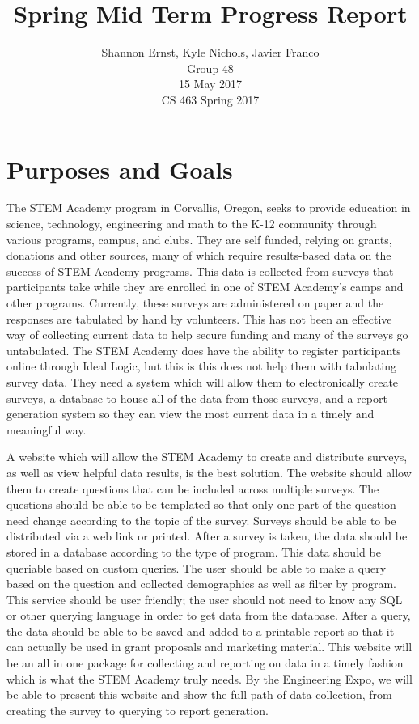 \documentclass[letterpaper,10pt,serif,draftclsnofoot,onecolumn,compsoc,titlepage]{IEEEtran}
\title{Spring Mid Term Progress Report}
\author{Shannon Ernst, Kyle Nichols, Javier Franco\\ Group 48 \\ 15 May 2017 \\ CS 463 Spring 2017}
\begin{document}
\maketitle
\begin{abstract}

\end{abstract}
\newpage
\tableofcontents
\newpage
\section{Purposes and Goals}
The STEM Academy program in Corvallis, Oregon, seeks to provide education in science, technology, engineering and math to the K-12 community through various programs, campus, and clubs.
They are self funded, relying on grants, donations and other sources, many of which require results-based data on the success of STEM Academy programs.
This data is collected from surveys that participants take while they are enrolled in one of STEM Academy's camps and other programs.
Currently, these surveys are administered on paper and the responses are tabulated by hand by volunteers.
This has not been an effective way of collecting current data to help secure funding and many of the surveys go untabulated.
The STEM Academy does have the ability to register participants online through Ideal Logic, but this is this does not help them with tabulating survey data.
They need a system which will allow them to electronically create surveys, a database to house all of the data from those surveys, and a report generation system so they can view the most current data in a timely and meaningful way.

A website which will allow the STEM Academy to create and distribute surveys, as well as view helpful data results, is the best solution.
The website should allow them to create questions that can be included across multiple surveys.
The questions should be able to be templated so that only one part of the question need change according to the topic of the survey.
Surveys should be able to be distributed via a web link or printed.
After a survey is taken, the data should be stored in a database according to the type of program.
This data should be queriable based on custom queries.
The user should be able to make a query based on the question and collected demographics as well as filter by program.
This service should be user friendly; the user should not need to know any SQL or other querying language in order to get data from the database.
After a query, the data should be able to be saved and added to a printable report so that it can actually be used in grant proposals and marketing material.
This website will be an all in one package for collecting and reporting on data in a timely fashion which is what the STEM Academy truly needs.
By the Engineering Expo, we will be able to present this website and show the full path of data collection, from creating the survey to querying to report generation.
\end{document}
